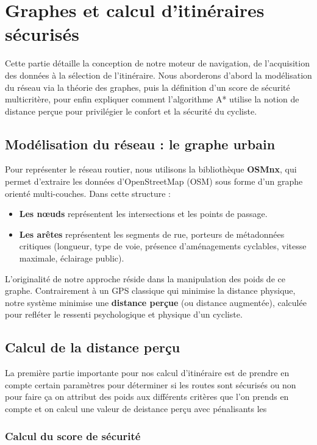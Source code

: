 \section{Graphes et calcul d'itinéraires sécurisés}
\label{sec:graphes}

Cette partie détaille la conception de notre moteur de navigation, de l'acquisition des données à la sélection de l'itinéraire. Nous aborderons d'abord la modélisation du réseau via la théorie des graphes, puis la définition d'un score de sécurité multicritère, pour enfin expliquer comment l'algorithme A* utilise la notion de distance perçue pour privilégier le confort et la sécurité du cycliste.

\subsection{Modélisation du réseau : le graphe urbain}

Pour représenter le réseau routier, nous utilisons la bibliothèque \textbf{OSMnx}, qui permet d'extraire les données d'OpenStreetMap (OSM) sous forme d'un graphe orienté multi-couches. Dans cette structure :
\begin{itemize}
\item \textbf{Les nœuds} représentent les intersections et les points de passage.
\item \textbf{Les arêtes} représentent les segments de rue, porteurs de métadonnées critiques (longueur, type de voie, présence d'aménagements cyclables, vitesse maximale, éclairage public).
\end{itemize}

L'originalité de notre approche réside dans la manipulation des poids de ce graphe. Contrairement à un GPS classique qui minimise la distance physique, notre système minimise une \textbf{distance perçue} (ou distance augmentée), calculée pour refléter le ressenti psychologique et physique d'un cycliste.

\subsection{Calcul de la distance perçu}
La première partie importante pour nos calcul d'itinéraire est de prendre en compte certain paramètres pour déterminer si les routes sont sécurisés ou non pour faire ça on attribut des poids aux différents critères
que l'on prends en compte et on calcul une valeur de deistance perçu avec pénalisants les

\subsubsection{Calcul du score de sécurité}

